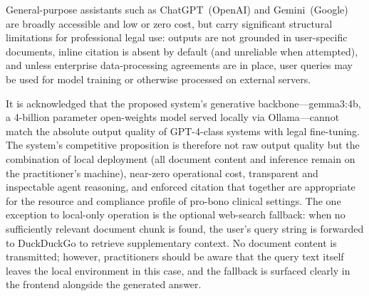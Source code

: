 \documentclass[11pt,a4paper]{article}
\begin{document}
General-purpose assistants such as ChatGPT~(OpenAI) and Gemini~(Google) are broadly accessible
and low or zero cost, but carry significant structural limitations for professional legal use:
outputs are not grounded in user-specific documents, inline citation is absent by default (and
unreliable when attempted), and unless enterprise data-processing agreements are in place,
user queries may be used for model training or otherwise processed on external servers.

\begin{table}[h]
\centering
{}
\caption{Comparison of current legal assistance technologies.}
\label{tab:comparison}
\end{table}

\noindent It is acknowledged that the proposed system's generative backbone---gemma3:4b, a 4-billion parameter open-weights model served locally via Ollama---cannot match the absolute output quality of GPT-4-class systems with legal fine-tuning. The system's
competitive proposition is therefore not raw output quality but the combination of local
deployment (all document content and inference remain on the practitioner's machine), near-zero operational cost,
transparent and inspectable agent reasoning, and enforced citation that together are
appropriate for the resource and compliance profile of pro-bono clinical settings.
The one exception to local-only operation is the optional web-search fallback: when no
sufficiently relevant document chunk is found, the user's query string is forwarded to
DuckDuckGo to retrieve supplementary context.  No document content is transmitted;
however, practitioners should be aware that the query text itself leaves the local
environment in this case, and the fallback is surfaced clearly in the frontend alongside
the generated answer.
\end{document}
